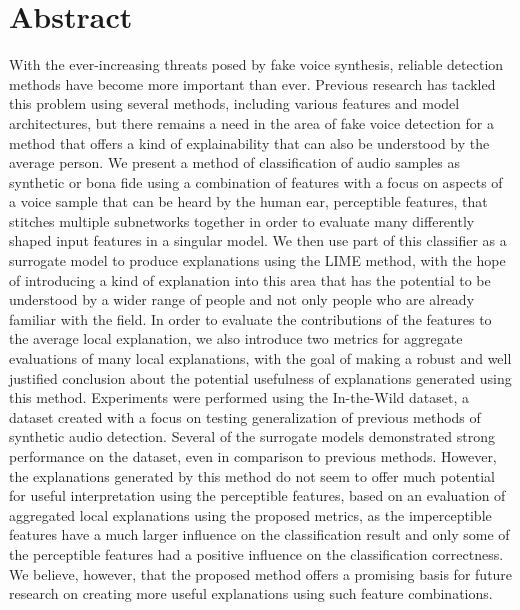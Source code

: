 \documentclass{article}
\begin{document}
    \section{Abstract}
	With the ever-increasing threats posed by fake voice synthesis, reliable detection methods
	have become more important than ever. Previous research has tackled this problem using several
	methods, including various features and model architectures, but there remains a need in the
	area of fake voice detection for a method that offers a kind of explainability that can also
	be understood by the average person. We present a method of classification of audio samples as
	synthetic or bona fide using a combination of features with a focus on aspects of a voice
	sample that can be heard by the human ear, perceptible features, that stitches multiple
	subnetworks together in order to evaluate many differently shaped input features in a singular
	model. We then use part of this classifier as a surrogate model to produce explanations using
	the LIME method, with the hope of introducing a kind of explanation into this area that has
	the potential to be understood by a wider range of people and not only people who are already
	familiar with the field. In order to evaluate the contributions of the features to the average
	local explanation, we also introduce two metrics for aggregate evaluations of many local
	explanations, with the goal of making a robust and well justified conclusion about the
	potential usefulness of explanations generated using this method. Experiments were performed
	using the In-the-Wild dataset, a dataset created with a focus on testing generalization of
	previous methods of synthetic audio detection. Several of the surrogate models demonstrated
	strong performance on the dataset, even in comparison to previous methods. However, the
	explanations generated by this method do not seem to offer much potential for useful
	interpretation using the perceptible features, based on an evaluation of aggregated local
	explanations using the proposed metrics, as the imperceptible features have a much larger
	influence on the classification result and only some of the perceptible features had a
	positive influence on the classification correctness. We believe, however, that the proposed
	method offers a promising basis for future research on creating more useful explanations using
	such feature combinations.
\end{document}

